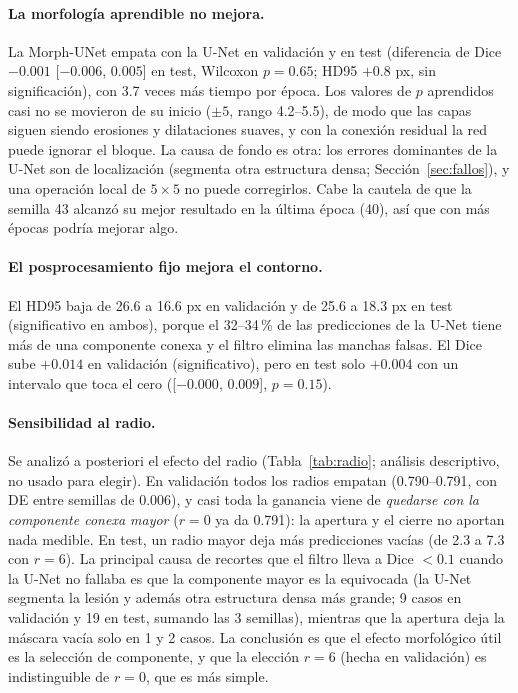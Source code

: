 \documentclass[11pt,a4paper]{article}
\begin{document}
\paragraph{La morfología aprendible no mejora.} La Morph-UNet empata con la U-Net en validación y en test (diferencia de Dice $-0.001$ [$-0.006$, $0.005$] en test, Wilcoxon $p=0.65$; HD95 $+0.8$ px, sin significación), con 3.7 veces más tiempo por época. Los valores de $p$ aprendidos casi no se movieron de su inicio ($\pm5$, rango 4.2--5.5), de modo que las capas siguen siendo erosiones y dilataciones suaves, y con la conexión residual la red puede ignorar el bloque. La causa de fondo es otra: los errores dominantes de la U-Net son de localización (segmenta otra estructura densa; Sección~\ref{sec:fallos}), y una operación local de $5\times5$ no puede corregirlos. Cabe la cautela de que la semilla 43 alcanzó su mejor resultado en la última época (40), así que con más épocas podría mejorar algo.

\paragraph{El posprocesamiento fijo mejora el contorno.} El HD95 baja de 26.6 a 16.6 px en validación y de 25.6 a 18.3 px en test (significativo en ambos), porque el 32--34\,\% de las predicciones de la U-Net tiene más de una componente conexa y el filtro elimina las manchas falsas. El Dice sube $+0.014$ en validación (significativo), pero en test solo $+0.004$ con un intervalo que toca el cero ([$-0.000$, $0.009$], $p=0.15$).

\paragraph{Sensibilidad al radio.} Se analizó a posteriori el efecto del radio (Tabla~\ref{tab:radio}; análisis descriptivo, no usado para elegir). En validación todos los radios empatan (0.790--0.791, con DE entre semillas de 0.006), y casi toda la ganancia viene de \emph{quedarse con la componente conexa mayor} ($r=0$ ya da 0.791): la apertura y el cierre no aportan nada medible. En test, un radio mayor deja más predicciones vacías (de 2.3 a 7.3 con $r=6$). La principal causa de recortes que el filtro lleva a Dice $<0.1$ cuando la U-Net no fallaba es que la componente mayor es la equivocada (la U-Net segmenta la lesión y además otra estructura densa más grande; 9 casos en validación y 19 en test, sumando las 3 semillas), mientras que la apertura deja la máscara vacía solo en 1 y 2 casos. La conclusión es que el efecto morfológico útil es la selección de componente, y que la elección $r=6$ (hecha en validación) es indistinguible de $r=0$, que es más simple.
\end{document}
